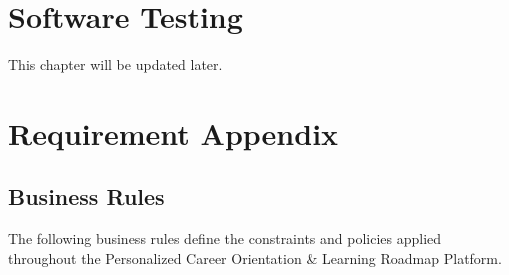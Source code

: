 \chapter{Software Testing}

This chapter will be updated later.


\chapter{Requirement Appendix}

\section{Business Rules}

The following business rules define the constraints and policies applied throughout the Personalized Career Orientation \& Learning Roadmap Platform.

